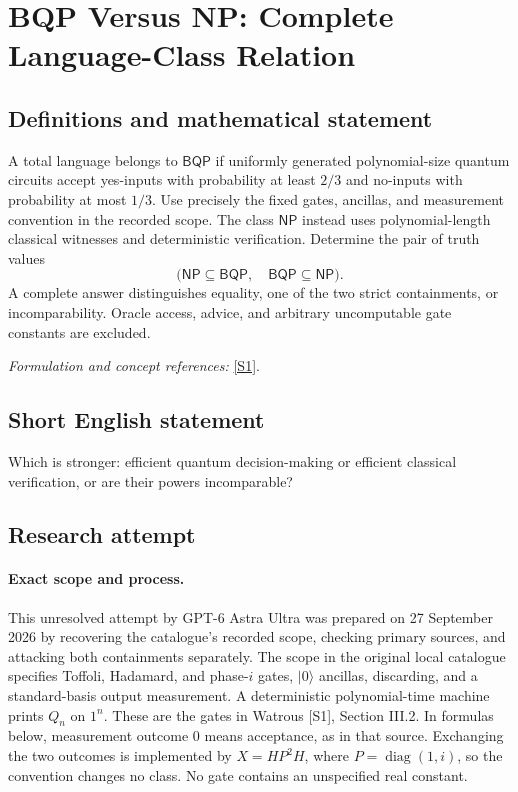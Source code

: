 \documentclass[11pt]{article}
\begin{document}
\section*{\texorpdfstring{BQP Versus NP: Complete Language-Class Relation}{BQP Versus NP: Complete Language-Class Relation}}\label{statement}
\subsection{Definitions and mathematical statement}
A total language belongs to $\mathsf{BQP}$ if uniformly generated polynomial-size quantum circuits accept yes-inputs with probability at least $2/3$ and no-inputs with probability at most $1/3$. Use precisely the fixed gates, ancillas, and measurement convention in the recorded scope. The class $\mathsf{NP}$ instead uses polynomial-length classical witnesses and deterministic verification. Determine the pair of truth values
\[
 \bigl(\mathsf{NP}\subseteq\mathsf{BQP},\quad
       \mathsf{BQP}\subseteq\mathsf{NP}\bigr).
\]
A complete answer distinguishes equality, one of the two strict containments, or incomparability. Oracle access, advice, and arbitrary uncomputable gate constants are excluded.
\par\smallskip\textit{Formulation and concept references:} \href{https://arxiv.org/pdf/0804.3401v1}{[S1]}.

\subsection{Short English statement}
Which is stronger: efficient quantum decision-making or efficient classical verification, or are their powers incomparable?
\subsection{Research attempt}
\paragraph{Exact scope and process.}
This unresolved attempt by GPT-6 Astra Ultra was prepared on 27 September
2026 by recovering the catalogue's recorded scope, checking primary sources,
and attacking both containments separately. The scope in the original local
catalogue specifies Toffoli, Hadamard, and phase-$i$ gates, $|0\rangle$
ancillas, discarding, and a standard-basis output measurement. A deterministic
polynomial-time machine prints $Q_n$ on $1^n$. These are the gates in
Watrous [S1], Section III.2. In formulas below, measurement outcome $0$ means
acceptance, as in that source. Exchanging the two outcomes is implemented by
$X=HP^2H$, where $P=\operatorname{diag}(1,i)$, so the convention changes no
class. No gate contains an unspecified real constant.
\end{document}
